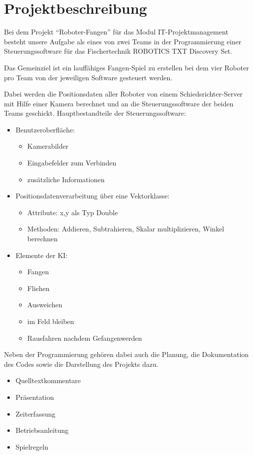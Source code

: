 \section{Projektbeschreibung}

Bei dem Projekt "`Roboter-Fangen"' für das Modul IT-Projektmanagement besteht unsere Aufgabe als eines von zwei Teams in der Programmierung einer Steuerungssoftware für das Fischertechnik ROBOTICS TXT Discovery Set.

Das Gemeinziel ist ein lauffähiges Fangen-Spiel zu erstellen bei dem vier Roboter pro Team von der jeweiligen Software gesteuert werden.

Dabei werden die Positionsdaten aller Roboter von einem Schiedsrichter-Server mit Hilfe einer Kamera berechnet und an die Steuerungssoftware der beiden Teams geschickt.
Hauptbestandteile der Steuerungssoftware:
\begin{itemize}
	\item Benutzeroberfläche:
	\begin{itemize}
		\item Kamerabilder
		\item Eingabefelder zum Verbinden
		\item zusätzliche Informationen
	\end{itemize}
	\item Positionsdatenverarbeitung über eine Vektorklasse:
	\begin{itemize}
		\item Attribute: x,y als Typ Double
		\item Methoden: Addieren, Subtrahieren, Skalar multiplizieren, Winkel berechnen
	\end{itemize}
	\item Elemente der KI:
	\begin{itemize}
		\item Fangen
		\item Fliehen
		\item Ausweichen
		\item im Feld bleiben
		\item Rausfahren nachdem Gefangenwerden\\
	\end{itemize}
\end{itemize}
Neben der Programmierung gehören dabei auch die Planung, die Dokumentation des Codes sowie die Darstellung des Projekts dazu.
\begin{itemize}
	\item Quelltextkommentare
	\item Präsentation
	\item Zeiterfassung
	\item Betriebsanleitung
	\item Spielregeln
\end{itemize}